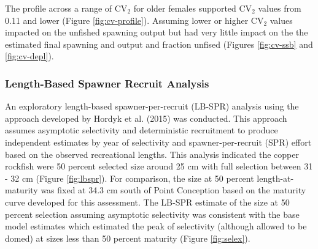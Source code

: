 \documentclass[11pt,
  english,
  a4paper,
]{article}
\begin{document}
\leavevmode\tagmcend\tagstructend\par


The profile across a range of {\(\text{CV}_2\)\leavevmode\tagmcend\tagstructend} for older females supported {\(\text{CV}_2\)\leavevmode\tagmcend\tagstructend} values from 0.11 and lower (Figure \ref{fig:cv-profile}). Assuming lower or higher {\(\text{CV}_2\)\leavevmode\tagmcend\tagstructend} values impacted on the unfished spawning output but had very little impact on the the estimated final spawning and output and fraction unfised (Figures \ref{fig:cv-ssb} and \ref{fig:cv-depl}).

\leavevmode\tagmcend\tagstructend\par


\hypertarget{length-based-spawner-recruit-analysis}{%
\subsubsection{Length-Based Spawner Recruit Analysis}\label{length-based-spawner-recruit-analysis}}

\leavevmode\tagmcend\tagstructend


An exploratory length-based spawner-per-recruit (LB-SPR) analysis using the approach developed by Hordyk et al. {(2015)\leavevmode\tagmcend\tagstructend} was conducted. This approach assumes asymptotic selectivity and deterministic recruitment to produce independent estimates by year of selectivity and spawner-per-recruit (SPR) effort based on the observed recreational lengths. This analysis indicated the copper rockfish were 50 percent selected size around 25 cm with full selection between 31 - 32 cm (Figure \ref{fig:lbspr}). For comparison, the size at 50 percent length-at-maturity was fixed at 34.3 cm south of Point Conception based on the maturity curve developed for this assessment. The LB-SPR estimate of the size at 50 percent selection assuming asymptotic selectivity was consistent with the base model estimates which estimated the peak of selectivity (although allowed to be domed) at sizes less than 50 percent maturity (Figure \ref{fig:selex}).
\end{document}
